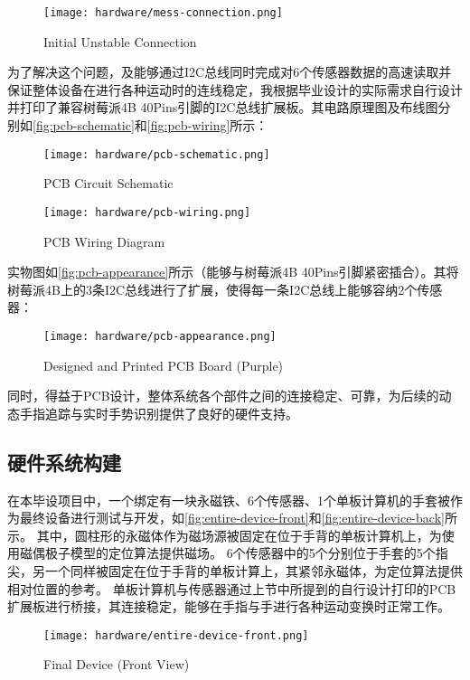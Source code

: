 \begin{figure}[H]
    \centering
    \texttt{[image: hardware/mess-connection.png]}
    \caption{\label{fig:mess-connection}Initial Unstable Connection}
\end{figure}

为了解决这个问题，及能够通过I2C总线同时完成对6个传感器数据的高速读取并保证整体设备在进行各种运动时的连线稳定，我根据毕业设计的实际需求自行设计并打印了兼容树莓派4B 40Pins引脚的I2C总线扩展板。其电路原理图及布线图分别如\autoref{fig:pcb-schematic}和\autoref{fig:pcb-wiring}所示：

\begin{figure}[H]
    \centering
    \texttt{[image: hardware/pcb-schematic.png]}
    \caption{\label{fig:pcb-schematic}PCB Circuit Schematic}
\end{figure}

\begin{figure}[H]
    \centering
    \texttt{[image: hardware/pcb-wiring.png]}
    \caption{\label{fig:pcb-wiring}PCB Wiring Diagram}
\end{figure}

实物图如\autoref{fig:pcb-appearance}所示（能够与树莓派4B 40Pins引脚紧密插合）。其将树莓派4B上的3条I2C总线进行了扩展，使得每一条I2C总线上能够容纳2个传感器：

\begin{figure}[H]
    \centering
    \texttt{[image: hardware/pcb-appearance.png]}
    \caption{\label{fig:pcb-appearance}Designed and Printed PCB Board (Purple)}
\end{figure}

同时，得益于PCB设计，整体系统各个部件之间的连接稳定、可靠，为后续的动态手指追踪与实时手势识别提供了良好的硬件支持。
\subsection{硬件系统构建}
在本毕设项目中，一个绑定有一块永磁铁、6个传感器、1个单板计算机的手套被作为最终设备进行测试与开发，如\autoref{fig:entire-device-front}和\autoref{fig:entire-device-back}所示。
其中，圆柱形的永磁体作为磁场源被固定在位于手背的单板计算机上，为使用磁偶极子模型的定位算法提供磁场。
6个传感器中的5个分别位于手套的5个指尖，另一个同样被固定在位于手背的单板计算上，其紧邻永磁体，为定位算法提供相对位置的参考。
单板计算机与传感器通过上节中所提到的自行设计打印的PCB扩展板进行桥接，其连接稳定，能够在手指与手进行各种运动变换时正常工作。

\begin{figure}[H]
    \centering
    \texttt{[image: hardware/entire-device-front.png]}
    \caption{\label{fig:entire-device-front}Final Device (Front View)}
\end{figure}

